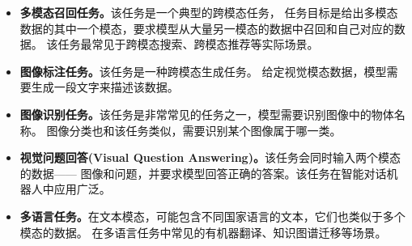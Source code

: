 \begin{itemize}
    \item \textbf{多模态召回任务。}该任务是一个典型的跨模态任务，
    任务目标是给出多模态数据的其中一个模态，要求模型从大量另一模态的数据中召回和自己对应的数据。
    该任务最常见于跨模态搜索、跨模态推荐等实际场景。
    \item \textbf{图像标注任务。}该任务是一种跨模态生成任务。
    给定视觉模态数据，模型需要生成一段文字来描述该数据。
    \item \textbf{图像识别任务。}该任务是非常常见的任务之一，模型需要识别图像中的物体名称。
    图像分类也和该任务类似，需要识别某个图像属于哪一类。
    \item \textbf{视觉问题回答(Visual Question Answering)。}该任务会同时输入两个模态的数据——
    图像和问题，并要求模型回答正确的答案。该任务在智能对话机器人中应用广泛。
    \item \textbf{多语言任务。}在文本模态，可能包含不同国家语言的文本，它们也类似于多个模态的数据。
    在多语言任务中常见的有机器翻译、知识图谱迁移等场景。
\end{itemize}
